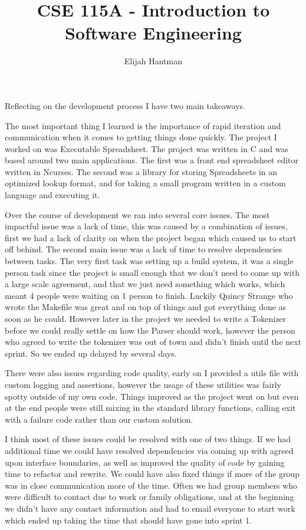 \documentclass{report}
\title{\Huge{CSE 115A - Introduction to Software Engineering}}
\author{\huge{Elijah Hantman}}
\date{}
\begin{document}
\maketitle
\newpage

Reflecting on the development process I have two main takeaways.

The most important thing I learned is the importance of rapid iteration
and communication when it comes to getting things done quickly. The project
I worked on was Executable Spreadsheet. The project was written in C
and was based around two main applications. The first was a front end
spreadsheet editor written in Ncurses. The second was a library for storing
Spreadsheets in an optimized lookup format, and for taking a small
program written in a custom language and executing it.

Over the course of development we ran into several core issues. The most
impactful issue was a lack of time, this was caused by a combination of issues,
first we had a lack of clarity on when the project began which caused
us to start off behind. The second main issue was a lack of time to resolve
dependencies between tasks. The very first task was setting up a build system,
it was a single person task since the project is small enough that we don't
need to come up with a large scale agreement, and that we just need something
which works, which meant 4 people were waiting on 1 person to finish. Luckily
Quincy Strange who wrote the Makefile was great and on top of things and
got everything done as soon as he could. However later in the project we needed
to write a Tokenizer before we could really settle on how the Parser should work,
however the person who agreed to write the tokenizer was out of town and didn't
finish until the next sprint. So we ended up delayed by several days.

There were also issues regarding code quality, early on I provided a utils file
with custom logging and assertions, however the usage of these utilities was fairly
spotty outside of my own code. Things improved as the project went on but
even at the end people were still mixing in the standard library functions, calling
exit with a failure code rather than our custom solution.

I think most of these issues could be resolved with one of two things. If we had
additional time we could have resolved dependencies via coming up with agreed upon
interface boundaries, as well as improved the quality of code by gaining time to
refactor and rewrite. We could have also fixed things if more of the group was in close
communication more of the time. Often we had group members who were difficult to contact
due to work or family obligations, and at the beginning we didn't have any contact
information and had to email everyone to start work which ended up taking the time
that should have gone into sprint 1.
\end{document}

